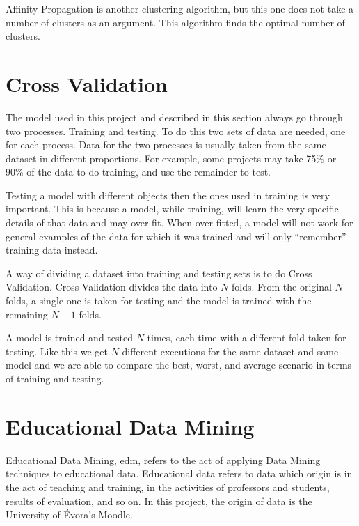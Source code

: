 Affinity Propagation is another clustering algorithm, but this one does not
take a number of clusters as an argument. This algorithm finds the optimal
number of clusters.~\cite{book_ml,book_dm_practical}

\section{Cross Validation}

The model used in this project and described in this section always go through
two processes. Training and testing. To do this two sets of data are needed,
one for each process. Data for the two processes is usually taken from the same
dataset in different proportions. For example, some projects may take 75\% or
90\% of the data to do training, and use the remainder to test.

Testing a model with different objects then the ones used in training is very
important. This is because a model, while training, will learn the very
specific details of that data and may over fit. When over fitted, a model will
not work for general examples of the data for which it was trained and will
only ``remember'' training data instead.

A way of dividing a dataset into training and testing sets is to do Cross
Validation. Cross Validation divides the data into $ N $ folds. From the
original $ N $ folds, a single one is taken for testing and the model is
trained with the remaining $ N - 1 $ folds.

A model is trained and tested $ N $ times, each time with a different fold
taken for testing. Like this we get $ N $ different executions for the same
dataset and same model and we are able to compare the best, worst, and average
scenario in terms of training and testing.~\cite{book_dm_practical}

\section{Educational Data Mining}


Educational Data Mining, \gls{edm}, refers to the act of applying Data Mining
techniques to educational data. Educational data refers to data which origin is
in the act of teaching and training, in the activities of professors and
students, results of evaluation, and so on. In this project, the origin of data
is the University of Évora's Moodle.

